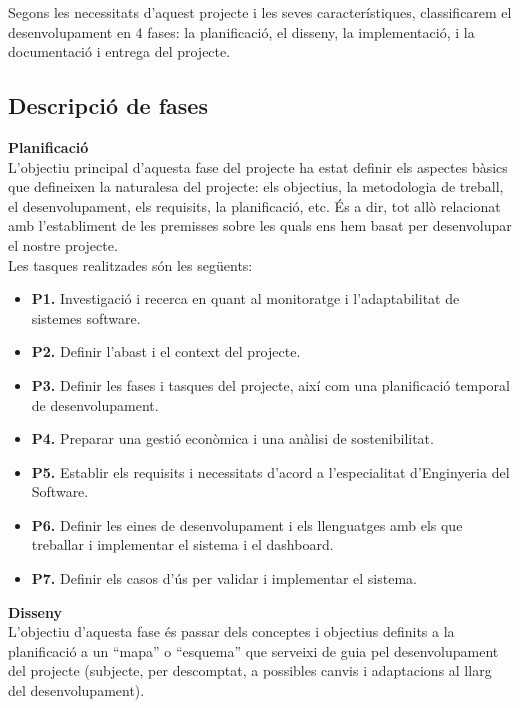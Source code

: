 Segons les necessitats d’aquest projecte i les seves característiques, classificarem el desenvolupament en 4 fases: la planificació, el disseny, la implementació, i la documentació i entrega del projecte. 

\subsection{Descripció de fases}

\noindent \textbf{\large Planificació}\\

\noindent L’objectiu principal d’aquesta fase del projecte ha estat definir els aspectes bàsics que defineixen la naturalesa del projecte: els objectius, la metodologia de treball, el desenvolupament, els requisits, la planificació, etc. És a dir, tot allò relacionat amb l’establiment de les premisses sobre les quals ens hem basat per desenvolupar el nostre projecte. \\

Les tasques realitzades són les següents:

\begin{itemize}
\item \textbf{P1.} Investigació i recerca en quant al monitoratge i l’adaptabilitat de sistemes software.
\item \textbf{P2.} Definir l’abast i el context del projecte. 
\item \textbf{P3.} Definir les fases i tasques del projecte, així com una planificació temporal de desenvolupament.
\item \textbf{P4.} Preparar una gestió econòmica i una anàlisi de sostenibilitat.
\item \textbf{P5.} Establir els requisits i necessitats d’acord a l’especialitat d’Enginyeria del Software.
\item \textbf{P6.} Definir les eines de desenvolupament i els llenguatges amb els que treballar i implementar el sistema i el dashboard.
\item \textbf{P7.} Definir els casos d'ús per validar i implementar el sistema.
\end{itemize}

\noindent \textbf{\large Disseny}\\

L'objectiu d’aquesta fase és passar dels conceptes i objectius definits a la planificació a un “mapa” o “esquema” que serveixi de guia pel desenvolupament del projecte (subjecte, per descomptat, a possibles canvis i adaptacions al llarg del desenvolupament). \\

